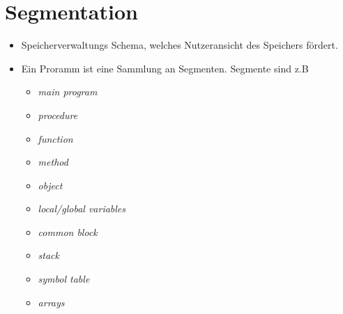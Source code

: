 \documentclass[a4paper]{scrreprt}
\begin{document}
\section{Segmentation}
\begin{itemize}
\item Speicherverwaltungs Schema, welches Nutzeransicht des Speichers fördert.
\item Ein Proramm ist eine Sammlung an Segmenten. Segmente sind z.B
\begin{itemize}
\item \textit{main program}
\item \textit{procedure}
\item \textit{function}
\item \textit{method}
\item \textit{object}
\item \textit{local/global variables}
\item \textit{common block}
\item \textit{stack}
\item \textit{symbol table}
\item \textit{arrays}

\end{itemize}
\end{itemize}
\end{document}

